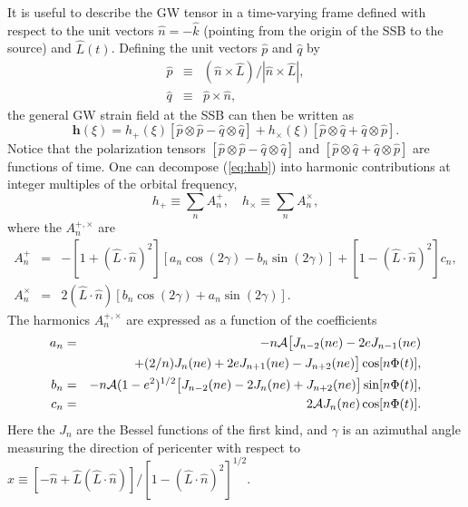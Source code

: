 \documentclass{iopart}
\def\be{\begin{equation}}
\def\ee{\end{equation}}
\begin{document}
It is useful to describe the GW tensor in a time-varying frame defined with respect to the unit vectors ${\hat n} = -{\hat k}$ (pointing from the origin of the SSB to the source) and ${ \hat L}(t)$. Defining the unit vectors 
${ \hat p}$ and ${ \hat q}$ by
\begin{eqnarray} \label{pq}
{ \hat p} &\equiv& ({ \hat n}\times { \hat L})/
                    |{ \hat n}\times { \hat L}|, \nonumber\\
{ \hat q} &\equiv& { \hat p} \times { \hat n},
\end{eqnarray}
the general GW strain field at the SSB can then be written as
%
\begin{equation}
\label{eq:hab}
\mathbf{h}(\xi) = h_{+}(\xi) \left[ \hat{p}\otimes \hat{p} - \hat{q}\otimes \hat{q} \right] + h_{\times}(\xi) \left[ \hat{p}\otimes \hat{q} + \hat{q}\otimes \hat{p} \right].
\end{equation}
%
Notice that the polarization tensors $[ \hat{p}\otimes \hat{p} - \hat{q}\otimes \hat{q}]$  and $[ \hat{p}\otimes \hat{q} + \hat{q}\otimes \hat{p}]$ are functions of time. 
One can decompose (\ref{eq:hab}) into harmonic contributions at integer multiples of the orbital frequency,
\be
h_{+}\equiv \sum_n A^{+}_n, \quad h_{\times}\equiv \sum_n A^{\times}_n,
\label{harmonics}
\ee
where the $A^{+,\times}_n$ are
\begin{eqnarray} \label{A}
A^{+}_n &=&-[1+({ \hat L}\cdot{ \hat n})^2]\left[
a_n\cos(2\gamma)-b_n\sin(2\gamma)\right]
+[1-({ \hat L}\cdot{ \hat n})^2]c_n, \nonumber\\
A^{\times}_n&=& 2({ \hat L}\cdot{ \hat n})\left[
b_n \cos(2\gamma)+a_n \sin(2\gamma)\right].
\end{eqnarray}
The harmonics $A^{+,\times}_n$ are expressed as a function of the coefficients
\begin{eqnarray} \label{abc}
a_n &=& - n{\cal A}\bigl[J_{n-2}(ne)-2eJ_{n-1}(ne) \nonumber \\
       && +(2/n)J_n(ne) +2eJ_{n+1}(ne)-J_{n+2}(ne)\bigr]\cos[n\Phi(t)], \\
b_n &=& - n{\cal A}(1-e^2)^{1/2}\bigl[J_{n-2}(ne)-2J_{n}(ne)
+J_{n+2}(ne)\bigr]\sin[n \Phi(t)],
\nonumber\\
c_n &=& 2{\cal A}J_n(ne)\cos[n\Phi(t)]. \nonumber
\end{eqnarray}
Here the $J_n$ are the Bessel functions of the first kind, and $\gamma$ is an azimuthal angle measuring the direction of pericenter with respect to $\hat x \equiv [-\hat n + \hat L (\hat L\cdot \hat n)]/[1-(\hat L\cdot \hat n)^2]^{1/2}$.
\end{document}
